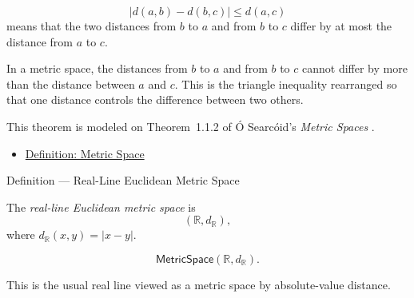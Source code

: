 \begin{remark*}
\[
\bigl|d(a,b)-d(b,c)\bigr|\leq d(a,c)
\]
means that the two distances from \(b\) to \(a\) and from \(b\) to \(c\)
differ by at most the distance from \(a\) to \(c\).
\end{remark*}

\begin{remark*}[Interpretation]
In a metric space, the distances from \(b\) to \(a\) and from \(b\) to \(c\)
cannot differ by more than the distance between \(a\) and \(c\).  This is the
triangle inequality rearranged so that one distance controls the difference
between two others.
\end{remark*}

\begin{remark*}
This theorem is modeled on Theorem~1.1.2 of
{\'O} Searc{\'o}id's \emph{Metric Spaces} \cite{OSearcoidMetricSpaces}.
\end{remark*}


\begin{dependencies}
\begin{itemize}
  \item \hyperref[def:metric-space]{Definition: Metric Space}
\end{itemize}
\end{dependencies}

\begin{definitionbox}{Definition --- Real-Line Euclidean Metric Space}
\begin{definition}
\label{def:real-line-euclidean-metric-space}
The \emph{real-line Euclidean metric space} is
\[
  (\mathbb{R},d_{\mathbb{R}}),
\]
where \(d_{\mathbb{R}}(x,y)=|x-y|\).
\end{definition}
\end{definitionbox}

\begin{remark*}
\[
\mathsf{MetricSpace}(\mathbb{R},d_{\mathbb{R}}).
\]
\end{remark*}

\begin{remark*}[Interpretation]
This is the usual real line viewed as a metric space by absolute-value
distance.
\end{remark*}

